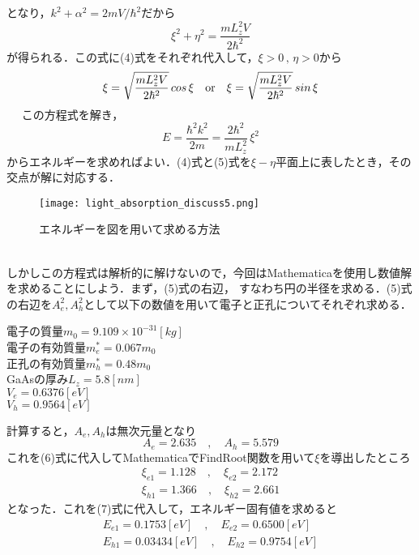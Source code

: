 \documentclass[a4paper,11pt,titlepage]{jsarticle}
\begin{document}
となり，$k^2+\alpha^2 = 2mV/\hbar^2$だから\\
\begin{equation}
    \xi^2 + \eta^2 = \frac{mL_z^2V}{2\hbar^2} %
\end{equation}
が得られる．この式に(4)式をそれぞれ代入して，$\xi > 0\,,\,\eta > 0$から
\begin{equation}
    \xi=\sqrt{\frac{mL_z^2V}{2\hbar^2}}\,cos\,\xi\quad{\rm or}\quad \xi=\sqrt{\frac{mL_z^2V}{2\hbar^2}}\,sin\,\xi
\end{equation}　%
この方程式を解き，
\begin{equation}
    E = \frac{\hbar^2k^2}{2m} = \frac{2\hbar^2}{mL_z^2}\,\xi^2 %
\end{equation}
からエネルギーを求めればよい．(4)式と(5)式を$\xi - \eta$平面上に表したとき，その交点が解に対応する．
\begin{figure}[h]
    \centering
    \texttt{[image: light\_absorption\_discuss5.png]}
    \caption{エネルギーを図を用いて求める方法}
\end{figure}\\
しかしこの方程式は解析的に解けないので，今回はMathematicaを使用し数値解を求めることにしよう．まず，(5)式の右辺，
すなわち円の半径を求める．(5)式の右辺を$A_e^2,A_h^2$として以下の数値を用いて電子と正孔についてそれぞれ求める．
\begin{center}
    電子の質量$m_0=9.109\times 10^{-31}[kg]$\\
    電子の有効質量$m_e^* = 0.067m_0$\\
    正孔の有効質量$m_h^* = 0.48m_0$\\
    GaAsの厚み$L_z = 5.8[nm]$\\
    $V_e = 0.6376[eV]$\\
    $V_h = 0.9564[eV]$
\end{center}
計算すると，$A_e,A_h$は無次元量となり
\begin{equation}
    A_e = 2.635\quad , \quad A_h = 5.579
\end{equation}
これを(6)式に代入してMathematicaでFindRoot関数を用いて$\xi$を導出したところ
\begin{equation}
    \begin{split}
        \xi_{e1} = 1.128\quad , \quad \xi_{e2} = 2.172\\
        \xi_{h1} = 1.366\quad , \quad \xi_{h2} = 2.661
    \end{split}
\end{equation}
となった．これを(7)式に代入して，エネルギー固有値を求めると
\begin{equation}
    \begin{split}
        E_{e1} = 0.1753[eV]\quad , \quad E_{e2} = 0.6500[eV]\\
        E_{h1} = 0.03434[eV]\quad , \quad E_{h2} = 0.9754[eV]
    \end{split}
\end{equation}
\end{document}
